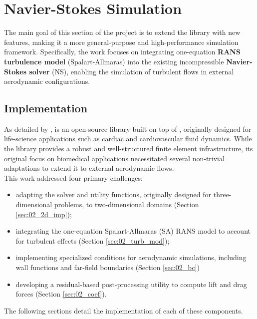 \section{Navier-Stokes Simulation}
\label{sec:02_Navier-Stokes_Simulation}

The main goal of this section of the project is to extend the \textbf{\lifex} library  with new features, making it a more general-purpose and high-performance simulation framework. Specifically, the work focuses on integrating one-equation \textbf{RANS turbulence model} (Spalart-Allmaras) into the existing incompressible \textbf{Navier-Stokes solver} (NS), enabling the simulation of turbulent flows in external aerodynamic configurations.

\subsection{\textbf{\lifex} Implementation}
\label{sec:lifex_impl}

As detailed by \citet{africa2024lifex}, \textbf{\lifex} is an open-source \cpp library built on top of \dealii, originally designed for life-science applications such as cardiac and cardiovascular fluid dynamics. While the library provides a robust and well-structured finite element infrastructure, its original focus on biomedical applications necessitated several non-trivial adaptations to extend it to external aerodynamic flows.\\

This work addressed four primary challenges:
\begin{itemize}
    \item[-] adapting the solver and utility functions, originally designed for three-dimensional problems, to two-dimensional domains (Section \ref{sec:02_2d_imp});
    \item[-] integrating the one-equation Spalart-Allmaras (SA) RANS model to account for turbulent effects (Section \ref{sec:02_turb_mod});
    \item[-] implementing specialized conditions for aerodynamic simulations, including wall functions and far-field boundaries (Section \ref{sec:02_bc})
    \item[-] developing a residual-based post-processing utility to compute lift and drag forces (Section \ref{sec:02_coef}).
\end{itemize}
\vspace{2ex}
The following sections detail the implementation of each of these components.

